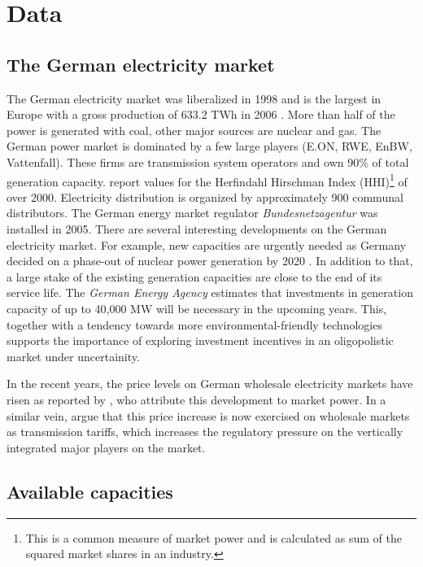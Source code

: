\section{Data}

\subsection{The German electricity market}
\label{sec:germ-electr-mark}

The German electricity market was liberalized in 1998 and is the largest in Europe with a gross production of 633.2 TWh in 2006 \citep{IEA2007}. More than half of the power is generated with coal, other major sources are nuclear and gas. The German power market is dominated by a few large players (E.ON, RWE, EnBW, Vattenfall). These firms are transmission system operators and own 90\% of total generation capacity. \cite{Brunekreeft2006} report values for the Herfindahl Hirschman Index (HHI)\footnote{This is a common measure of market power and is calculated as sum of the squared market shares in an industry.} of over 2000. Electricity distribution is organized by approximately 900 communal distributors. The German energy market regulator  \emph{Bundesnetzagentur} was installed in 2005. There are several interesting developments on the German electricity market. For example, new capacities are urgently needed as Germany decided on a phase-out of nuclear power generation by 2020 \citep[see e.g.][]{IEA2007a}. In addition to that, a large stake of the existing generation capacities are close to the end of its service life. The \emph{German Energy Agency} estimates that investments in generation capacity of up to 40,000 MW will be necessary in the upcoming years. This, together with a tendency towards more environmental-friendly technologies supports the importance of exploring investment incentives in an oligopolistic market under uncertainity.
 
In the recent years, the price levels on German wholesale electricity markets have risen as reported by \cite{Weigt2007}, who attribute this development to market power. In a similar vein, \cite{Brunekreeft2005} argue that this price increase is now exercised on wholesale markets as transmission tariffs, which increases the regulatory pressure on the vertically integrated major players on the market.

\subsection{Available capacities}
\label{sec:available-capacities}

